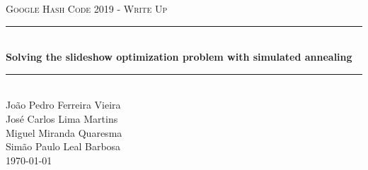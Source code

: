 \documentclass{article}
\newcommand{\titleRule}{
    \rule{\linewidth}{0.5mm} \\ [0.25cm]
}
\begin{document}
\begin{titlepage}
    \center
    \textsc{\LARGE Google Hash Code 2019 - Write Up} \\ [1.5cm]
    \titleRule
    {\huge \bfseries Solving the slideshow optimization problem with simulated annealing}
    \titleRule

    João Pedro Ferreira Vieira \\
    José Carlos Lima Martins \\
    Miguel Miranda Quaresma \\
    Simão Paulo Leal Barbosa \\[0.25cm]

    \today
\end{titlepage}
\end{document}
